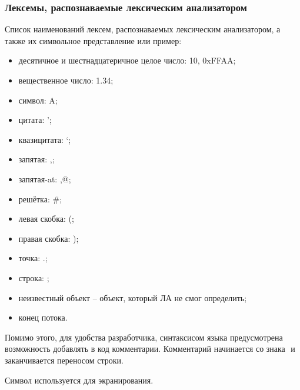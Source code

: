 \subsubsection{Лексемы, распознаваемые лексическим анализатором}

Список наименований лексем, распознаваемых лексическим анализатором, а также их символьное представление или пример:
\begin{itemize}
	\item десятичное и шестнадцатеричное целое число: 10, 0xFFAA;
	\item вещественное число: 1.34;
	\item символ: A;
	\item цитата: ';
	\item квазицитата: `;
	\item запятая: ,;
	\item запятая-at: ,@;
	\item решётка: \#;
	\item левая скобка: (;
	\item правая скобка: );
	\item точка: .;
	\item строка: ;
	\item неизвестный объект -- объект, который ЛА не смог определить;
	\item конец потока.
\end{itemize}

Помимо этого, для удобства разработчика, синтаксисом языка предусмотрена возможность добавлять в код комментарии. Комментарий начинается со знака ‭\quotes{;} и заканчивается переносом строки.

Символ \quotes{\textbackslash} используется для экранирования.


